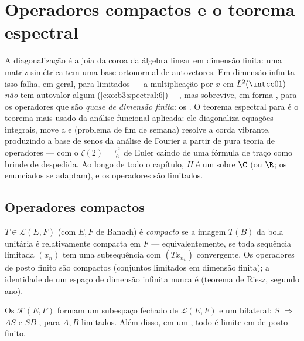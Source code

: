 \chapter{Operadores compactos e o teorema espectral}
\label{ch:b3:spectral}

A diagonalização é a joia da coroa da álgebra linear em dimensão
finita: uma matriz simétrica tem uma base ortonormal de autovetores. Em
dimensão infinita isso falha, em geral, para 
limitados --- a multiplicação por $x$ em $L^2(\intcc01)$ \emph{não} tem autovalor
algum (\cref{exo:b3:spectral:6}) ---, mas sobrevive, em forma , para os
operadores que são \emph{quase de dimensão finita}: os . O
teorema espectral para   é o teorema
mais usado da análise funcional aplicada: ele diagonaliza equações
integrais, move a  e (problema de fim de semana)
resolve a corda vibrante, produzindo a base de senos da análise de
Fourier a partir de pura teoria de operadores --- com o $\zeta(2) = \frac{\pi^2}6$ de Euler
caindo de uma fórmula de traço como brinde de despedida. Ao longo de
todo o capítulo, $H$ é um  sobre $\C$ (ou $\R$;
os enunciados se adaptam), e os operadores são limitados.

\section{Operadores compactos}

\begin{definition}\label{def:b3:spectral:compact}
$T \in \mathcal L(E, F)$ (com $E, F$ de Banach) é \emph{compacto} se a imagem $T(B)$ da bola unitária é relativamente
compacta em $F$ --- equivalentemente, se toda sequência limitada
$(x_n)$ tem uma subsequência com $(Tx_{n_k})$ convergente. Os operadores de
posto finito são compactos (conjuntos limitados em dimensão finita); a
identidade de um espaço de dimensão infinita nunca é (teorema de Riesz,
segundo ano).
\end{definition}

\begin{proposition}\label{prop:b3:spectral:ideal}
Os  $\mathcal K(E, F)$ formam um subespaço fechado de $\mathcal L(E, F)$ e um
 bilateral: $S$  $\Rightarrow$ $AS$ e $SB$ , para
$A, B$ limitados. Além disso, em um , todo  é limite em  de posto finito.
\end{proposition}

